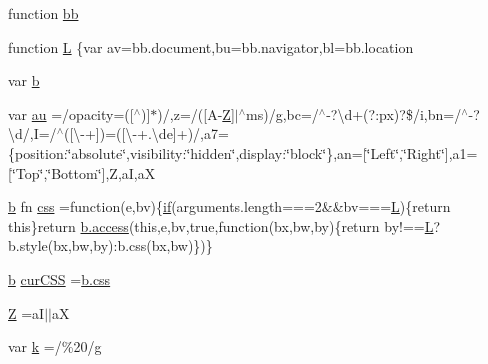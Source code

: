 \begin{DoxyCompactItemize}
\item 
function \hyperlink{docs_2_programmer's_manual_2html_2jquery_8js_a1d6558865876e1c8cca029fce41a4bdb}{bb}
\item 
function \hyperlink{docs_2_programmer's_manual_2html_2jquery_8js_a38ee4c0b5f4fe2a18d0c783af540d253}{L} \{var av=bb.\+document,bu=bb.\+navigator,bl=bb.\+location
\item 
var \hyperlink{docs_2_programmer's_manual_2html_2jquery_8js_aa4026ad5544b958e54ce5e106fa1c805}{b}
\item 
var \hyperlink{docs_2_programmer's_manual_2html_2jquery_8js_a4fd8ddfab07c8d7c7cae0ab0e052cad3}{au} =/opacity=(\mbox{[}$^\wedge$)\mbox{]}$\ast$)/,z=/(\mbox{[}A-\/\hyperlink{html_2jquery_8js_adc18d83abfd9f87d396e8fd6b6ac0fe1}{Z}\mbox{]}$\vert$$^\wedge$ms)/g,bc=/$^\wedge$-\/?\textbackslash{}d+(?\+:px)?\$/i,bn=/$^\wedge$-\/?\textbackslash{}d/,I=/$^\wedge$(\mbox{[}\textbackslash{}-\/+\mbox{]})=(\mbox{[}\textbackslash{}-\/+.\textbackslash{}de\mbox{]}+)/,a7=\{position\+:\char`\"{}absolute\char`\"{},visibility\+:\char`\"{}hidden\char`\"{},display\+:\char`\"{}block\char`\"{}\},an=\mbox{[}\char`\"{}Left\char`\"{},\char`\"{}Right\char`\"{}\mbox{]},a1=\mbox{[}\char`\"{}Top\char`\"{},\char`\"{}Bottom\char`\"{}\mbox{]},Z,a\+I,a\+X
\item 
\hyperlink{html_2jquery_8js_a2fa551895933fae935a0a6b87282241d}{b} fn \hyperlink{docs_2_programmer's_manual_2html_2jquery_8js_a89ad527fcd82c01ebb587332f5b4fcd4}{css} =function(e,bv)\{\hyperlink{html_2jquery_8js_a42cbfadee2b4749e8f699ea8d745a0e4}{if}(arguments.\+length===2\&\&bv===\hyperlink{html_2jquery_8js_a38ee4c0b5f4fe2a18d0c783af540d253}{L})\{return this\}return \hyperlink{tables_8h_a360a726ac0b61d9e4e1be3ad34f80244}{b.\+access}(this,e,bv,true,function(bx,bw,by)\{return by!==\hyperlink{html_2jquery_8js_a38ee4c0b5f4fe2a18d0c783af540d253}{L}?b.\+style(bx,bw,by)\+:b.\+css(bx,bw)\})\}
\item 
\hyperlink{html_2jquery_8js_a2fa551895933fae935a0a6b87282241d}{b} \hyperlink{docs_2_programmer's_manual_2html_2jquery_8js_a88b21f8ba3af86d6981b1da520ece33b}{cur\+C\+S\+S} =\hyperlink{html_2jquery_8js_a89ad527fcd82c01ebb587332f5b4fcd4}{b.\+css}
\item 
\hyperlink{docs_2_programmer's_manual_2html_2jquery_8js_adc18d83abfd9f87d396e8fd6b6ac0fe1}{Z} =a\+I$\vert$$\vert$a\+X
\item 
var \hyperlink{docs_2_programmer's_manual_2html_2jquery_8js_ab26645c014aa005ecedef329ecf58c99}{k} =/\%20/g
\item 

\end{DoxyCompactItemize}
